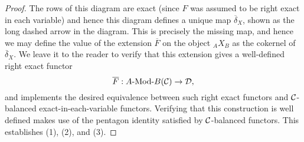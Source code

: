 \documentclass{amsart}
\begin{document}
\begin{proof}
The rows of this diagram are exact (since $F$ was assumed to be right exact in each variable) and hence this diagram defines a unique map $\overline{\delta}_X$, shown as the long dashed arrow in the diagram. This is precisely the missing map, and hence we may define the value of the extension $\overline{F}$ on the object ${}_AX_B$ as the cokernel of $\overline{\delta}_X$. We leave it to the reader to verify that this extension gives a well-defined right exact functor 
\begin{equation*}
	\overline{F}: \Mod{A}{B}(\cC) \to \cD,
\end{equation*} 
and implements the desired equivalence between such right exact functors and $\mathcal C$-balanced exact-in-each-variable functors. Verifying that this construction is well defined makes use of the pentagon identity satisfied by $\mathcal C$-balanced functors. This establishes (1), (2), and (3). 



\end{proof}
\end{document}
